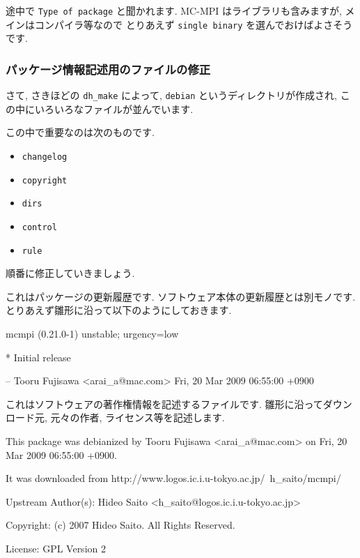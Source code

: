 \documentclass[mingoth,a4paper]{jsarticle}
\begin{document}
\begin{commandline}
途中で \verb|Type of package| と聞かれます.
MC-MPI はライブラリも含みますが, メインはコンパイラ等なので
とりあえず \verb|single binary| を選んでおけばよさそうです.

\subsubsection{パッケージ情報記述用のファイルの修正}

さて, さきほどの \verb|dh_make| によって, \verb|debian| というディレクトリが作成され,
この中にいろいろなファイルが並んでいます.

この中で重要なのは次のものです.

\begin{itemize}
 \item \verb|changelog|
 \item \verb|copyright|
 \item \verb|dirs|
 \item \verb|control|
 \item \verb|rule|
\end{itemize}

順番に修正していきましょう.


これはパッケージの更新履歴です.
ソフトウェア本体の更新履歴とは別モノです.
とりあえず雛形に沿って以下のようにしておきます.

\begin{commandline}
mcmpi (0.21.0-1) unstable; urgency=low

  * Initial release

 -- Tooru Fujisawa <arai_a@mac.com>  Fri, 20 Mar 2009 06:55:00 +0900
\end{commandline}


これはソフトウェアの著作権情報を記述するファイルです.
雛形に沿ってダウンロード元, 元々の作者, ライセンス等を記述します.

\begin{commandline}
This package was debianized by Tooru Fujisawa <arai_a@mac.com> on
Fri, 20 Mar 2009 06:55:00 +0900.

It was downloaded from http://www.logos.ic.i.u-tokyo.ac.jp/~h_saito/mcmpi/

Upstream Author(s):
    Hideo Saito <h_saito@logos.ic.i.u-tokyo.ac.jp>

Copyright:
    (c) 2007 Hideo Saito. All Rights Reserved.

License:
    GPL Version 2


\end{commandline}
\end{commandline}
\end{document}
